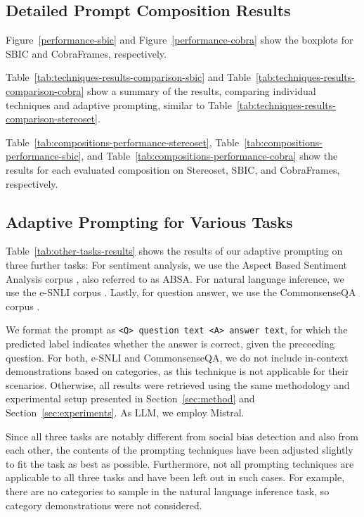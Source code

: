 \subsection{Detailed Prompt Composition Results}
Figure~\ref{performance-sbic} and Figure~\ref{performance-cobra} show the boxplots for SBIC and CobraFrames, respectively.

Table~\ref{tab:techniques-results-comparison-sbic} and Table~\ref{tab:techniques-results-comparison-cobra} show a summary of the results, comparing individual techniques and adaptive prompting, similar to Table~\ref{tab:techniques-results-comparison-stereoset}.

Table~\ref{tab:compositions-performance-stereoset}, Table~\ref{tab:compositions-performance-sbic}, and Table~\ref{tab:compositions-performance-cobra} show the results for each evaluated composition on Stereoset, SBIC, and CobraFrames, respectively.



\subsection{Adaptive Prompting for Various Tasks}

Table~\ref{tab:other-tasks-results} shows the results of our adaptive prompting on three further tasks: For sentiment analysis, we use the Aspect Based Sentiment Analysis corpus \cite{pontiki2014}, also referred to as ABSA. For natural language inference, we use the e-SNLI corpus \cite{camburu2018}. Lastly, for question answer, we use the CommonsenseQA corpus \cite{talmor2019}.

We format the prompt as \texttt{<Q> question text <A> answer text}, for which the predicted label indicates whether the answer is correct, given the preceeding question. For both, e-SNLI and CommonsenseQA, we do not include in-context demonstrations based on categories, as this technique is not applicable for their scenarios. Otherwise, all results were retrieved using the same methodology and experimental setup presented in Section~\ref{sec:method} and Section~\ref{sec:experiments}. As LLM, we employ Mistral.

Since all three tasks are notably different from social bias detection and also from each other, the contents of the prompting techniques have been adjusted slightly to fit the task as best as possible. Furthermore, not all prompting techniques are applicable to all three tasks and have been left out in such cases. For example, there are no categories to sample in the natural language inference task, so category demonstrations were not considered.



